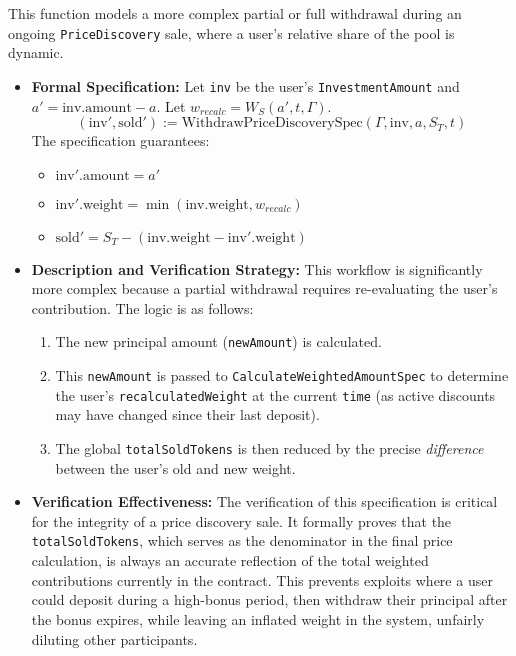 \documentclass[
  english,
  onecolumn]{article}
\providecommand{\tightlist}{%
  \setlength{\itemsep}{0pt}\setlength{\parskip}{0pt}}
\begin{document}
This function models a more complex partial or full withdrawal during an
ongoing \texttt{PriceDiscovery} sale, where a user's relative share of
the pool is dynamic.

\begin{itemize}
\tightlist
\item
  \textbf{Formal Specification:} Let \texttt{inv} be the user's
  \texttt{InvestmentAmount} and \(a' = \text{inv.amount} - a\). Let
  \(w_{recalc} = W_S(a', t, \Gamma)\). \[
  (\text{inv}', \text{sold}') := \text{WithdrawPriceDiscoverySpec}(\Gamma, \text{inv}, a, S_T, t)
  \] The specification guarantees:

  \begin{itemize}
  \tightlist
  \item
    \(\text{inv}'.\text{amount} = a'\)
  \item
    \(\text{inv}'.\text{weight} = \min(\text{inv.weight}, w_{recalc})\)
  \item
    \(\text{sold}' = S_T - (\text{inv.weight} - \text{inv}'.\text{weight})\)
  \end{itemize}
\item
  \textbf{Description and Verification Strategy:} This workflow is
  significantly more complex because a partial withdrawal requires
  re-evaluating the user's contribution. The logic is as follows:

  \begin{enumerate}
  \def\labelenumi{\arabic{enumi}.}
  \tightlist
  \item
    The new principal amount (\texttt{newAmount}) is calculated.
  \item
    This \texttt{newAmount} is passed to
    \texttt{CalculateWeightedAmountSpec} to determine the user's
    \texttt{recalculatedWeight} at the current \texttt{time} (as active
    discounts may have changed since their last deposit).
  \item
    The global \texttt{totalSoldTokens} is then reduced by the precise
    \emph{difference} between the user's old and new weight.
  \end{enumerate}
\item
  \textbf{Verification Effectiveness:} The verification of this
  specification is critical for the integrity of a price discovery sale.
  It formally proves that the \texttt{totalSoldTokens}, which serves as
  the denominator in the final price calculation, is always an accurate
  reflection of the total weighted contributions currently in the
  contract. This prevents exploits where a user could deposit during a
  high-bonus period, then withdraw their principal after the bonus
  expires, while leaving an inflated weight in the system, unfairly
  diluting other participants.
\end{itemize}
\end{document}
